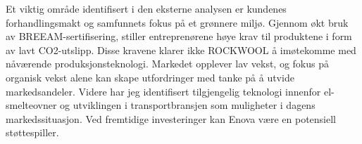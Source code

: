 \indent \newline
Et viktig område identifisert i den eksterne analysen er kundenes forhandlingsmakt og samfunnets fokus på et grønnere miljø. Gjennom økt bruk av BREEAM-sertifisering, stiller entreprenørene høye krav til produktene i form av lavt CO2-utslipp. Disse kravene klarer ikke ROCKWOOL å imøtekomme med nåværende produksjonsteknologi. Markedet opplever lav vekst, og fokus på organisk vekst alene kan skape utfordringer med tanke på å utvide markedsandeler. Videre har jeg identifisert tilgjengelig teknologi innenfor el-smelteovner og utviklingen i transportbransjen som muligheter i dagens markedssituasjon. Ved fremtidige investeringer kan Enova være en potensiell støttespiller.